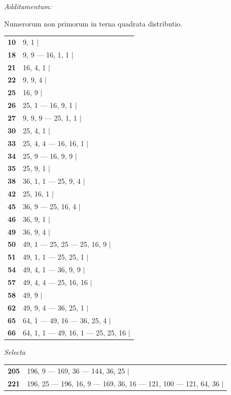 \begin{center}\textit{Additamentum:}\par\medskip
Numerorum non primorum in terna quadrata distributio.\end{center}
\begin{center}\begin{tabular}{@{}rl@{}}
\textbf{10}&9, 1 $\vert$\\
\textbf{18}&9, 9 — 16, 1, 1 $\vert$\\
\textbf{21}&16, 4, 1 $\vert$\\
\textbf{22}&9, 9, 4 $\vert$\\
\textbf{25}&16, 9 $\vert$\\
\textbf{26}&25, 1 — 16, 9, 1 $\vert$\\
\textbf{27}&9, 9, 9 — 25, 1, 1 $\vert$\\
\textbf{30}&25, 4, 1 $\vert$\\
\textbf{33}&25, 4, 4 — 16, 16, 1 $\vert$\\
\textbf{34}&25, 9 — 16, 9, 9 $\vert$\\
\textbf{35}&25, 9, 1 $\vert$\\
\textbf{38}&36, 1, 1 — 25, 9, 4 $\vert$\\
\textbf{42}&25, 16, 1 $\vert$\\
\textbf{45}&36, 9 — 25, 16, 4 $\vert$\\
\textbf{46}&36, 9, 1 $\vert$\\
\textbf{49}&36, 9, 4 $\vert$\\
\textbf{50}&49, 1 — 25, 25 — 25, 16, 9 $\vert$\\
\textbf{51}&49, 1, 1 — 25, 25, 1 $\vert$\\
\textbf{54}&49, 4, 1 — 36, 9, 9 $\vert$\\
\textbf{57}&49, 4, 4 — 25, 16, 16 $\vert$\\
\textbf{58}&49, 9 $\vert$\\
\textbf{62}&49, 9, 4 — 36, 25, 1 $\vert$\\
\textbf{65}&64, 1 — 49, 16 — 36, 25, 4 $\vert$\\
\textbf{66}&64, 1, 1 — 49, 16, 1 — 25, 25, 16 $\vert$
\end{tabular}\end{center}
\begin{center}\textit{Selecta}\end{center}
\begin{center}\begin{tabular}{@{}rl@{}}
\textbf{205}&196, 9 — 169, 36 — 144, 36, 25 $\vert$\\
\textbf{221}&196, 25 — 196, 16, 9 — 169, 36, 16 — 121, 100 — 121, 64, 36 $\vert$
\end{tabular}\end{center}
